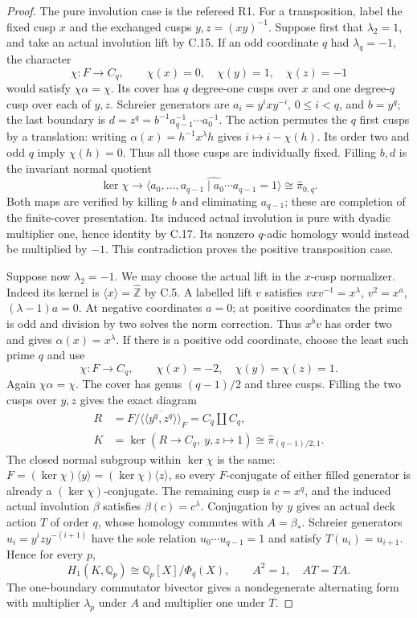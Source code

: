 \begin{proof}
The pure involution case is the refereed R1.
For a transposition, label the fixed cusp $x$ and
the exchanged cusps $y,z=(xy)^{-1}$.
Suppose first that $\lambda_2=1$, and take an
actual involution lift by C.15.  If an odd
coordinate $q$ had $\lambda_q=-1$, the character
\[
 \chi:F\to C_q,\qquad
 \chi(x)=0,\quad\chi(y)=1,\quad\chi(z)=-1
\]
would satisfy $\chi\alpha=\chi$.
Its cover has $q$ degree-one cusps over $x$ and
one degree-$q$ cusp over each of $y,z$.
Schreier generators are
$a_i=y^ixy^{-i}$, $0\leq i<q$, and $b=y^q$;
the last boundary is
$d=z^q=b^{-1}a_{q-1}^{-1}\cdots a_0^{-1}$.
The action permutes the $q$ first cusps by a
translation: writing $\alpha(x)=h^{-1}x^\lambda h$
gives $i\mapsto i-\chi(h)$.  Its order two and
odd $q$ imply $\chi(h)=0$.  Thus all those
cusps are individually fixed.  Filling $b,d$
is the invariant normal quotient
\[
 \ker\chi\longrightarrow
 \widehat{\langle a_0,\ldots,a_{q-1}\mid
                  a_0\cdots a_{q-1}=1\rangle}
       \cong\widehat\pi_{0,q}.
\]
Both maps are verified by killing $b$ and
eliminating $a_{q-1}$; these are completion of
the finite-cover presentation.  Its induced
actual involution is pure with dyadic multiplier
one, hence identity by C.17.  Its nonzero
$q$-adic homology would instead be multiplied
by $-1$.  This contradiction proves the positive
transposition case.

Suppose now $\lambda_2=-1$.  We may choose the
actual lift in the $x$-cusp normalizer.  Indeed
its kernel is $\langle x\rangle=\widehat{\mathbb Z}$
by C.5.  A labelled lift $v$ satisfies
$vxv^{-1}=x^\lambda$, $v^2=x^a$, $(\lambda-1)a=0$.
At negative coordinates $a=0$; at positive
coordinates the prime is odd and division by
two solves the norm correction.  Thus $x^bv$
has order two and gives $\alpha(x)=x^\lambda$.
If there is a positive odd coordinate, choose
the least such prime $q$ and use
\[
 \chi:F\to C_q,\qquad
 \chi(x)=-2,\quad\chi(y)=\chi(z)=1.
\]
Again $\chi\alpha=\chi$.  The cover has genus
$(q-1)/2$ and three cusps.  Filling the two
cusps over $y,z$ gives the exact diagram
\[
\begin{split}
 R&=F/\overline{\langle\!\langle y^q,z^q\rangle\!\rangle}_F
       =C_q\amalg C_q,\\
 K&=\ker(R\to C_q,\ y,z\mapsto1)
       \cong\widehat\pi_{(q-1)/2,1}.
\end{split}
\]
The closed normal subgroup within $\ker\chi$
is the same: $F=(\ker\chi)\langle y\rangle
 =(\ker\chi)\langle z\rangle$, so every
$F$-conjugate of either filled generator is
already a $(\ker\chi)$-conjugate.  The remaining
cusp is $c=x^q$, and the induced actual
involution $\beta$ satisfies $\beta(c)=c^\lambda$.
Conjugation by $y$ gives an actual deck action
$T$ of order $q$, whose homology commutes
with $A=\beta_*$.  Schreier generators
$u_i=y^izy^{-(i+1)}$ have the sole relation
$u_0\cdots u_{q-1}=1$ and satisfy $T(u_i)=u_{i+1}$.
Hence for every $p$,
\[
 H_1(K,\mathbb Q_p)\cong\mathbb Q_p[X]/\Phi_q(X),
            \qquad A^2=1,\quad AT=TA.
\]
The one-boundary commutator bivector gives a
nondegenerate alternating form with multiplier
$\lambda_p$ under $A$ and multiplier one under $T$.


\end{proof}
